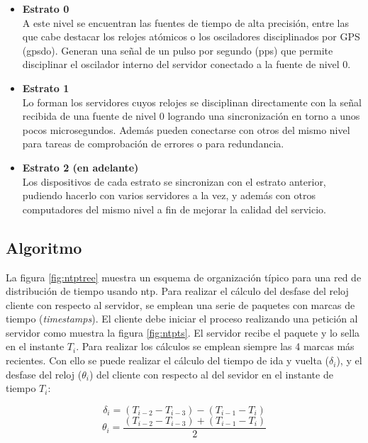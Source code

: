 \begin{itemize}
	\item \textbf{Estrato 0} \\ A este nivel se encuentran las fuentes de 
	tiempo de alta precisión, entre las que cabe destacar los relojes atómicos 
	o los osciladores disciplinados por GPS (\acrshort{gpsdo}). Generan una 
	señal de un pulso por segundo (\acrshort{pps}) que permite disciplinar el 
	oscilador interno del servidor conectado a la fuente de nivel 0.
	
	\item \textbf{Estrato 1} \\ Lo forman los servidores cuyos relojes se 
	disciplinan directamente con la señal recibida de una fuente de nivel 0 
	logrando una sincronización en torno a unos pocos microsegundos. Además 
	pueden conectarse con otros del mismo nivel para tareas de comprobación de 
	errores o para redundancia.
	
	\item \textbf{Estrato 2 (en adelante)} \\ Los dispositivos de cada estrato 
	se 
	sincronizan con el estrato anterior, pudiendo hacerlo con varios servidores 
	a la vez, y además con otros computadores del mismo nivel a 
	fin de mejorar la calidad del servicio.
\end{itemize}

\subsection{Algoritmo}

La figura \ref{fig:ntptree} muestra un esquema de organización típico para una 
red de distribución de tiempo usando \gls{ntp}. Para realizar el cálculo del 
desfase del reloj cliente con respecto al servidor, se emplean una serie de 
paquetes con marcas de tiempo (\textit{timestamps}). El cliente debe iniciar el 
proceso realizando una petición al servidor como muestra la figura 
\ref{fig:ntpts}. El servidor recibe el paquete y lo sella en el instante $T_i$. 
Para realizar los cálculos se emplean siempre las 4 marcas más recientes. Con 
ello se puede realizar el cálculo del tiempo de ida y vuelta ($\delta_i$), y el 
desfase del reloj ($\theta_i$) del cliente con respecto al del sevidor en el 
instante de tiempo $T_i$:

\begin{equation}\label{ntprtt}
	\delta_i = (T_{i-2}-T_{i-3}) - (T_{i-1}-T_{i})
\end{equation}\label{ntpoffset}
\begin{equation}
	\theta_i = \frac{(T_{i-2}-T_{i-3}) + (T_{i-1}-T_{i})} {2}
\end{equation}

